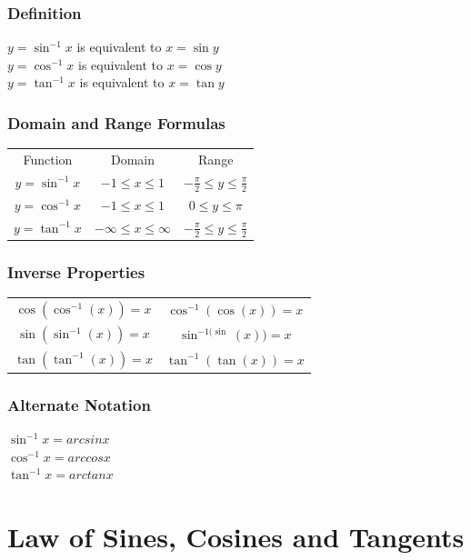 \documentclass[10pt,onecolumn]{article}
\begin{document}
{\section{Definition }

\(y = \sin^{-1} x\) is equivalent to \(x = \sin y\) \\
\(y = \cos^{-1} x\) is equivalent to \(x = \cos y\) \\
\(y = \tan^{-1} x\) is equivalent to \(x = \tan y\) \\


\section{ Domain and Range  Formulas}

\begin{tabular}{ccc}
Function & Domain & Range \\
\(y = \sin^{-1} x\) & \(-1 \le x \le 1\) & \(-\frac{\pi}{2} \le y \le \frac{\pi}{2}\) \\
\(y = \cos^{-1} x\) & \(-1 \le x \le 1\) & \(0 \le y \le \pi\) \\
\(y = \tan^{-1} x\) & \(-\infty \le x \le \infty\) & \(-\frac{\pi}{2} \le y \le \frac{\pi}{2}\)
\end{tabular}

\section{Inverse Properties}
\begin{tabular}{c|c}
\(\cos(\cos^{-1}(x)) = x \) & \(\cos^{-1}(\cos(x)) = x \) \\
\(\sin(\sin^{-1}(x)) = x \) & \(\sin^{-1(\sin}(x)) = x \)\\
\(\tan(\tan^{-1}(x)) = x \) & \(\tan^{-1}(\tan(x)) = x \)\\
\end{tabular}

\section{Alternate Notation}

\(\sin^{-1}x = arcsin x \) \\
\(\cos^{-1}x = arccos x \) \\
\(\tan^{-1}x = arctan x \) \\


\part{Law of Sines, Cosines and Tangents}

}
\end{document}
